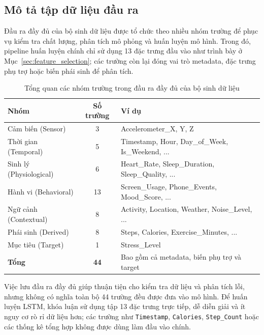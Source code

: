 \subsection{Mô tả tập dữ liệu đầu ra}
\label{subsec:dataset_description}

Đầu ra đầy đủ của bộ sinh dữ liệu được tổ chức theo nhiều nhóm trường để phục vụ kiểm tra chất lượng, phân tích mô phỏng và huấn luyện mô hình. Trong đó, pipeline huấn luyện chính chỉ sử dụng 13 đặc trưng đầu vào như trình bày ở Mục~\ref{sec:feature_selection}; các trường còn lại đóng vai trò metadata, đặc trưng phụ trợ hoặc biến phái sinh để phân tích.

\begin{table}[H]
\centering
\caption{Tổng quan các nhóm trường trong đầu ra đầy đủ của bộ sinh dữ liệu}
\label{tab:44_features}
\small
\begin{tabular}{|l|c|l|}
\hline
\textbf{Nhóm} & \textbf{Số trường} & \textbf{Ví dụ} \\
\hline
Cảm biến (Sensor)         & 3  & Accelerometer\_X, Y, Z \\
Thời gian (Temporal)       & 5  & Timestamp, Hour, Day\_of\_Week, Is\_Weekend, ... \\
Sinh lý (Physiological)   & 6  & Heart\_Rate, Sleep\_Duration, Sleep\_Quality, ... \\
Hành vi (Behavioral)       & 13 & Screen\_Usage, Phone\_Events, Mood\_Score, ... \\
Ngữ cảnh (Contextual)     & 8  & Activity, Location, Weather, Noise\_Level, ... \\
Phái sinh (Derived)        & 8  & Steps, Calories, Exercise\_Minutes, ... \\
Mục tiêu (Target)          & 1  & Stress\_Level \\
\hline
\textbf{Tổng}              & \textbf{44} & Bao gồm cả metadata, biến phụ trợ và target \\
\hline
\end{tabular}
\end{table}

Việc lưu đầu ra đầy đủ giúp thuận tiện cho kiểm tra dữ liệu và phân tích lỗi, nhưng không có nghĩa toàn bộ 44 trường đều được đưa vào mô hình. Để huấn luyện LSTM, khóa luận sử dụng tập 13 đặc trưng trực tiếp, dễ diễn giải và ít nguy cơ rò rỉ dữ liệu hơn; các trường như \texttt{Timestamp}, \texttt{Calories}, \texttt{Step\_Count} hoặc các thống kê tổng hợp không được dùng làm đầu vào chính.
